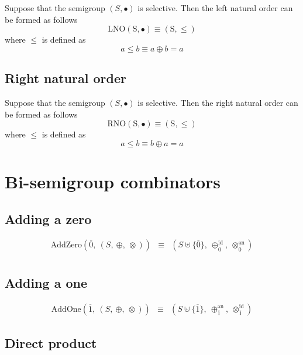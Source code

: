 \documentclass[10pt]{report}
\begin{document}
Suppose that the semigroup $(S , \bullet)$ is selective. Then the left natural order can be formed as follows
\begin{equation*}
\mathrm{LNO(S, \bullet)} \equiv \mathrm{(S , \leq)}
\end{equation*}
where $\leq$ is defined as
\begin{equation*}
a \leq b \equiv a \oplus b = a
\end{equation*}

\subsection{Right natural order}

Suppose that the semigroup $(S , \bullet)$ is selective. Then the right natural order can be formed as follows
\begin{equation*}
\mathrm{RNO(S, \bullet)} \equiv \mathrm{(S , \leq)}
\end{equation*}
where $\leq$ is defined as
\begin{equation*}
a \leq b \equiv b \oplus a = a
\end{equation*}

\section{Bi-semigroup combinators} 

\subsection{Adding a zero} 
\[ 
\begin{array}{rcl} 
\mathrm{AddZero}(\overline{0},\ (S,\ \oplus,\ \otimes)) 
   & \equiv 
   & (S \uplus \{\overline{0}\},\ \oplus_{\overline{0}}^{\mathrm{id}},\ \otimes_{\overline{0}}^{\mathrm{an}}) \\
\end{array} 
\] 

\subsection{Adding a one} 

\[ 
\begin{array}{rcl} 
\mathrm{AddOne}(\overline{1},\ (S,\ \oplus,\ \otimes)) 
   & \equiv 
   & (S \uplus \{\overline{1}\},\  \oplus_{\overline{1}}^{\mathrm{an}},\ \otimes_{\overline{1}}^{\mathrm{id}})
\end{array} 
\] 

\subsection{Direct product} 
\end{document}
